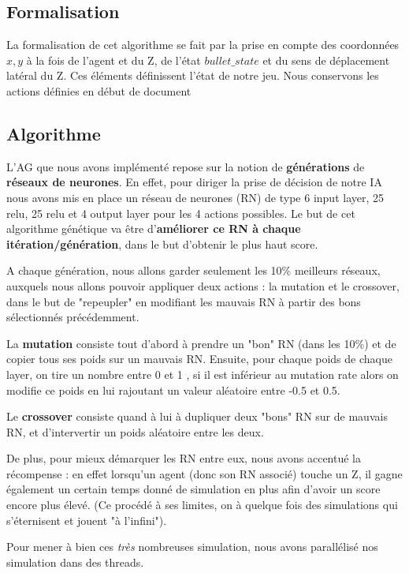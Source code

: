 \documentclass[12pt]{article}
\begin{document}
\begin{page}
\subsection{Formalisation}
La formalisation de cet algorithme se fait par la prise en compte des coordonnées $x,y$ à la fois de l'agent et du Z, de l'état $bullet\_state$ et du sens de déplacement latéral du Z. Ces éléments définissent l'état de notre jeu. Nous conservons les actions définies en début de document

\subsection{Algorithme}
L'AG que nous avons implémenté repose sur la notion de \textbf{générations} de \textbf{réseaux de neurones}. En effet, pour diriger la prise de décision de notre IA nous avons mis en place un réseau de neurones (RN) de type 6 input layer, 25 relu, 25 relu et 4 output layer pour les 4 actions possibles. Le but de cet algorithme génétique va être d'\textbf{améliorer ce RN à chaque itération/génération}, dans le but d'obtenir le plus haut score.

A chaque génération, nous allons garder seulement les 10\% meilleurs réseaux, auxquels nous allons pouvoir appliquer deux actions : la mutation et le crossover, dans le but de "repeupler" en modifiant les mauvais RN à partir des bons sélectionnés précédemment.

La \textbf{mutation} consiste tout d'abord à prendre un "bon" RN (dans les 10\%) et de copier tous ses poids sur un mauvais RN. Ensuite, pour chaque poids de chaque layer, on tire un nombre entre 0 et 1 , si il est inférieur au mutation rate alors on modifie ce poids en lui rajoutant un valeur aléatoire entre -0.5 et 0.5.

Le \textbf{crossover} consiste quand à lui à dupliquer deux "bons" RN sur de mauvais RN, et d'intervertir un poids aléatoire entre les deux.

De plus, pour mieux démarquer les RN entre eux, nous avons accentué la récompense : en effet lorsqu'un agent (donc son RN associé) touche un Z, il gagne également un certain temps donné de simulation en plus afin d'avoir un score encore plus élevé. (Ce procédé à ses limites, on à quelque fois des simulations qui s'éternisent et jouent "à l'infini").

Pour mener à bien ces \textit{très} nombreuses simulation, nous avons parallélisé nos simulation dans des threads.


\end{page}
\end{document}
